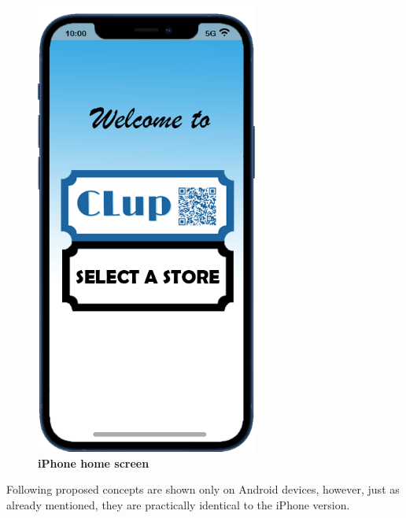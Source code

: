 \begin{itemize}
\begin{figure}[!htb]
\begin{minipage}{0.4\textwidth}
\includegraphics[width=0.65\textwidth]{Images/App/iPhone_HomeScreenv2}
\captionsetup{justification=centering}
\caption{\label{fig:iphonehomescreen}\textbf{iPhone home screen}}
\end{minipage}
\end{figure}
\end{itemize}

Following proposed concepts are shown only on Android devices, however, just as already mentioned, they are practically identical to the iPhone version.


